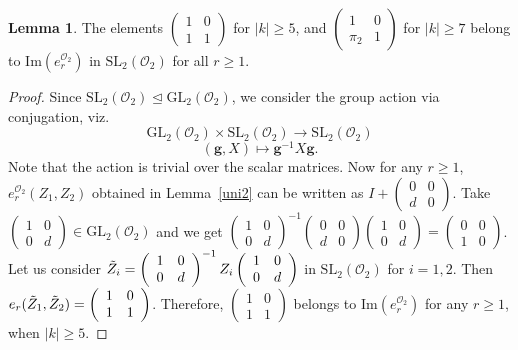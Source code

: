 \documentclass[10pt,twoside]{amsart}
\newcommand{\GL}{\mathrm{GL}}
\newcommand{\SL}{\mathrm{SL}}
\newcommand{\im}{\mathrm{Im}}
\newcommand{\R}{\mathcal{O}_2}
\theoremstyle{definition}
\theoremstyle{definition}
\newtheorem{lemma}[theorem]{Lemma}
\begin{document}
\begin{lemma}{\label{triang unipotent}} The elements $\left(\begin{array}{cc} 1   & 0 \\ 1   & 1 \end{array}\right)$ for $|k|\geq 5$, and $\left(\begin{array}{cc} 1   & 0 \\ \pi_2   & 1 \end{array} \right)$ for $|k|\geq 7$ belong to $\im(e_r^{\R})$ in $\SL_2(\R)$ for all $r\geq 1$.
\end{lemma}
\begin{proof}
Since $\SL_2(\R)\trianglelefteq \GL_2(\R)$, we consider the group action via conjugation, viz.
$$\GL_2(\R)\times \SL_2(\R)\longrightarrow \SL_2(\R) $$ $$(\mathbf{g},X)\mapsto \mathbf{g}^{-1}X\mathbf{g}.$$
Note that the action is trivial over the scalar matrices. Now for any $r\geq 1$, $e_r^{\R}(Z_1, Z_2)$ obtained in Lemma~\ref{uni2} can be written as $I + \left(\begin{array}{cc}
  0  & 0 \\  d & 0 \end{array}\right)$. Take $\left( \begin{array}{cc} 1  & 0 \\  0 & d \end{array} \right) \in \GL_2(\R)$ and we get $\left(\begin{array}{cc} 1  & 0 \\
0 & d \end{array} \right)^{-1} \left(\begin{array}{cc} 0  & 0 \\
d & 0 \end{array}\right)\left(\begin{array}{cc} 1  & 0 \\ 0 & d
\end{array}\right) = \left(\begin{array}{cc} 0  & 0 \\
 1 & 0 \end{array}\right)$. Let us consider $\Tilde{Z}_i = \left(\begin{array}{cc} 1  & 0 \\ 0 & d \end{array} \right)^{-1} Z_i \left(\begin{array}{cc}  1  & 0 \\ 0 & d
\end{array} \right)$ in $\SL_2(\R)$ for $i=1, 2$. Then $e_r(\Tilde{Z}_1, \Tilde{Z}_2) = \left(\begin{array}{cc}
1  & 0 \\ 1 & 1 \end{array}\right)$. Therefore, $ \left( \begin{array}{cc} 1  & 0 \\ 1 & 1 \end{array} \right)$ belongs to $\im(e_r^{\R})$ for any $r\geq 1$, when $|k|\geq 5$.


\end{proof}
\end{document}
